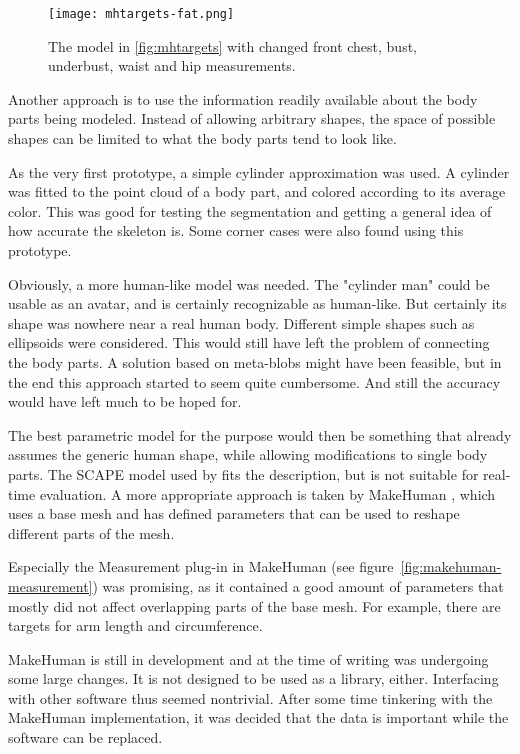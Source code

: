 \begin{figure}
    \centering
    \texttt{[image: mhtargets-fat.png]}
    \caption{The model in \ref{fig:mhtargets} with changed front chest, bust, underbust, waist and hip measurements.}
    \label{fig:mhtargets-fat}
\end{figure}

Another approach is to use the information readily available about the body parts being modeled. Instead of allowing arbitrary shapes, the space of possible shapes can be limited to what the body parts tend to look like.

As the very first prototype, a simple cylinder approximation was used. A cylinder was fitted to the point cloud of a body part, and colored according to its average color. This was good for testing the segmentation and getting a general idea of how accurate the skeleton is. Some corner cases were also found using this prototype.  

Obviously, a more human-like model was needed. The "cylinder man" could be usable as an avatar, and is certainly recognizable as human-like. But certainly its shape was nowhere near a real human body. Different simple shapes such as ellipsoids were considered. This would still have left the problem of connecting the body parts. A solution based on meta-blobs might have been feasible, but in the end this approach started to seem quite cumbersome. And still the accuracy would have left much to be hoped for.

The best parametric model for the purpose would then be something that already assumes the generic human shape, while allowing  modifications to single body parts. The SCAPE model \citep{anguelov2005scape} used by \citet{weiss2011home} fits the description, but is not suitable for real-time evaluation. A more appropriate approach is taken by MakeHuman \citep{makehuman}, which uses a base mesh and has defined parameters that can be used to reshape different parts of the mesh.

Especially the Measurement plug-in in MakeHuman (see figure~\ref{fig:makehuman-measurement}) was promising, as it contained a good amount of parameters that mostly did not affect overlapping parts of the base mesh. For example, there are targets for arm length and circumference.

MakeHuman is still in development and at the time of writing was undergoing some large changes. It is not designed to be used as a library, either. Interfacing with other software thus seemed nontrivial. After some time tinkering with the MakeHuman implementation, it was decided that the data is important while the software can be replaced.

